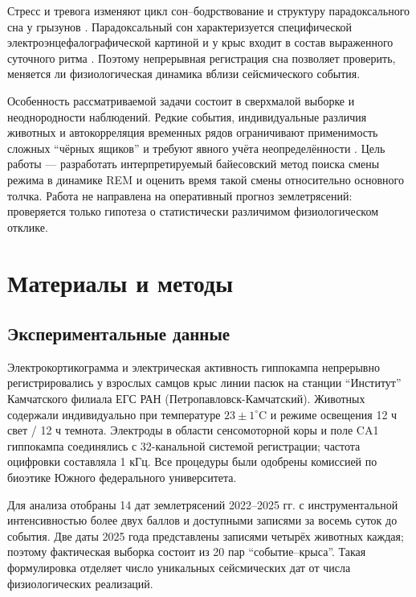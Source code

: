 \documentclass[14pt]{mmcs_article}
\begin{document}
Стресс и тревога изменяют цикл сон--бодрствование и структуру
парадоксального сна у грызунов
\cite{Rampin1991,Meerlo1997,Palma2000,Adrien1991,Sanford2010}.
Парадоксальный сон характеризуется специфической электроэнцефалографической
картиной и у крыс входит в состав выраженного суточного ритма
\cite{Vyazovskiy2005,Franken1991,WeberDan2016}. Поэтому непрерывная
регистрация сна позволяет проверить, меняется ли физиологическая динамика
вблизи сейсмического события.

Особенность рассматриваемой задачи состоит в сверхмалой выборке и
неоднородности наблюдений. Редкие события, индивидуальные различия
животных и автокорреляция временных рядов ограничивают применимость
сложных ``чёрных ящиков'' и требуют явного учёта неопределённости
\cite{Hyndman2018,Sinkovec2022}. Цель работы --- разработать
интерпретируемый байесовский метод поиска смены режима в динамике REM и
оценить время такой смены относительно основного толчка. Работа не
направлена на оперативный прогноз землетрясений: проверяется только
гипотеза о статистически различимом физиологическом отклике.

\section{Материалы и методы}

\subsection{Экспериментальные данные}

Электрокортикограмма и электрическая активность гиппокампа непрерывно
регистрировались у взрослых самцов крыс линии пасюк на станции
``Институт'' Камчатского филиала ЕГС РАН (Петропавловск-Камчатский).
Животных содержали индивидуально при температуре $23\pm1^{\circ}$C и
режиме освещения 12 ч свет / 12 ч темнота. Электроды в области
сенсомоторной коры и поле CA1 гиппокампа соединялись с 32-канальной
системой регистрации; частота оцифровки составляла 1 кГц. Все процедуры
были одобрены комиссией по биоэтике Южного федерального университета.

Для анализа отобраны 14 дат землетрясений 2022--2025 гг. с
инструментальной интенсивностью более двух баллов и доступными записями
за восемь суток до события. Две даты 2025 года представлены записями
четырёх животных каждая; поэтому фактическая выборка состоит из 20
пар ``событие--крыса''. Такая формулировка отделяет число уникальных
сейсмических дат от числа физиологических реализаций.
\end{document}
